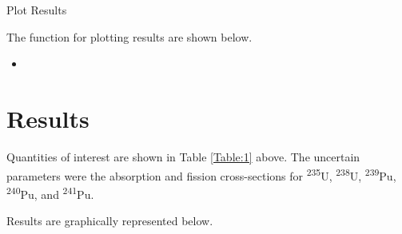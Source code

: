 \documentclass[11pt,notitlepage]{article}
\newcommand{\tss}{\textsuperscript}
\newcommand{\pythonscript}[2]{
\begin{itemize}
\item[]
\end{itemize}
}
\begin{document}
\begin{todolist}
  


  
\item{Plot Results}

  The function for plotting results are shown below.

  
  \pythonscript{../Origen2/Sample_Gen}{Sample Generation code}

  
\end{todolist}



\section{Results}

Quantities of interest are shown in Table \ref{Table:1} above.
The uncertain parameters were the absorption and fission
cross-sections for \tss{235}U, \tss{238}U, \tss{239}Pu,
\tss{240}Pu, and \tss{241}Pu.

Results are graphically represented below.
\end{document}
